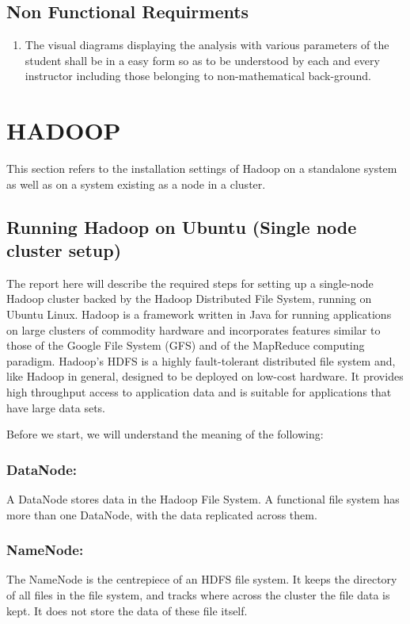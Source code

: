\documentclass[a4paper,12pt,oneside]{sphinxmanual}
\begin{document}
\section{\textbf{Non Functional Requirments}}
\label{document:non-functional-requirments}\begin{enumerate}
\item {} 
The visual diagrams displaying the analysis with various parameters of the student shall be in a easy form so as to be understood by each and every instructor including those belonging to non-mathematical back-ground.

\end{enumerate}


\chapter{HADOOP}
\label{document:hadoop}
This section refers to the installation settings of Hadoop on a standalone system
as well as on a system existing as a node in a cluster.


\section{Running Hadoop on Ubuntu (Single node cluster setup)}
\label{document:running-hadoop-on-ubuntu-single-node-cluster-setup}
The report here will describe the required steps for setting up a single-node Hadoop cluster backed by the Hadoop Distributed File System, running on Ubuntu Linux.
Hadoop is a framework written in Java for running applications on large clusters of commodity hardware and incorporates features similar to those of the Google File System (GFS) and of the MapReduce computing paradigm. Hadoop’s HDFS is a highly fault-tolerant distributed file system and, like Hadoop in general, designed to be deployed on low-cost hardware. It provides high throughput access to application data and is suitable for applications that have large data sets.

Before we start, we will understand the meaning of the following:


\subsection{DataNode:}
\label{document:datanode}
A DataNode stores data in the Hadoop File System. A functional file system has more than one DataNode, with the data replicated across them.


\subsection{NameNode:}
\label{document:namenode}
The NameNode is the centrepiece of an HDFS file system. It keeps the directory of all files in the file system, and tracks where across the cluster the file data is kept. It does not store the data of these file itself.
\end{document}

